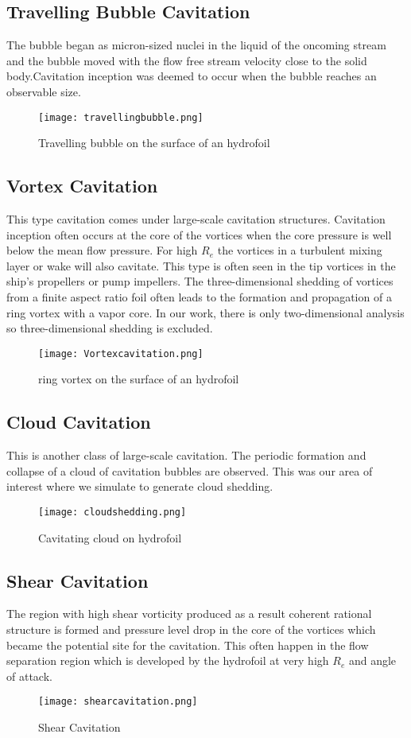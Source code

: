   \subsection{Travelling Bubble Cavitation}
  The bubble began as micron-sized nuclei in the liquid of the oncoming stream and the bubble moved with the flow free stream velocity close to the solid body.Cavitation inception was deemed to occur 
  when the bubble reaches an observable size.
  \begin{figure}[H]
    \centering
    \texttt{[image: travellingbubble.png]}
    \caption{Travelling bubble on the surface of an hydrofoil}
    \label{fig:fig6}
\end{figure}
\subsection{Vortex Cavitation}
This type cavitation comes under large-scale cavitation structures. Cavitation inception often occurs at the core of the vortices when the core pressure is well below the mean flow pressure.
For high $R_e$ the vortices in a turbulent mixing layer or wake will also cavitate. This type is often seen in the tip vortices in the ship's propellers or pump impellers.
The three-dimensional shedding of vortices from a finite aspect ratio foil often leads to the formation and propagation 
of a ring vortex with a vapor core. In our work, there is only two-dimensional analysis so three-dimensional shedding is excluded.
\begin{figure}[H]
 \centering
 \texttt{[image: Vortexcavitation.png]}
 \caption{ring vortex on the surface of an hydrofoil}
  \label{fig:fig8}
\end{figure}
\subsection{Cloud Cavitation}
This is another class of large-scale cavitation. The periodic formation and collapse of a cloud of cavitation bubbles are observed. This was our area of interest where we simulate to generate cloud shedding.
 \begin{figure}[H]
 \centering
 \texttt{[image: cloudshedding.png]}
 \caption{Cavitating cloud on hydrofoil}
  \label{fig:fig9}
\end{figure} 
\subsection{Shear Cavitation}
The region with high shear vorticity produced as a result coherent rational structure is formed and pressure level drop in the core of the vortices which became the potential site for the cavitation. This 
often happen in the flow separation region which is developed by the hydrofoil at very high $R_e$ and angle of attack.
\begin{figure}[H]
 \centering
 \texttt{[image: shearcavitation.png]}
 \caption{Shear Cavitation}
  \label{fig:fig10}
\end{figure}
